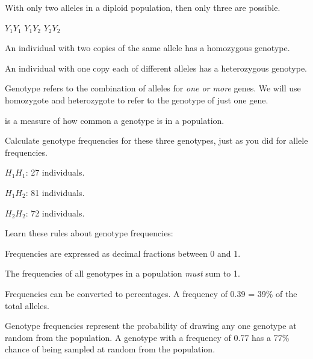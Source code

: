 \documentclass[t]{beamer}
\begin{document}
%
\begin{frame}[t]{With only two alleles in a diploid population, then only three  are possible.}

\Large
\hfil \alert<2>{$Y_1Y_1$} \hfil \alert<3>{$Y_1Y_2$} \hfil \alert<2>{$Y_2Y_2$} \hfill

\normalsize
	\hangpara {}An individual with two copies of the same allele has a \alert<2>{homozygous} genotype.
	
	\hangpara {}An individual with one copy each of different alleles has a \alert<3>{heterozygous} genotype.
	
	\hangpara {}\textsc{} Genotype refers to the combination of alleles for \emph{one or more} genes. We will use homozygote and heterozygote to refer to the genotype of just one gene.

\end{frame}
%
\begin{frame}[t]{ is a measure of how common a genotype is in a population.}

	\hangpara Calculate genotype frequencies for these three genotypes, just as you did for allele frequencies.
	
	\hangpara \quad $H_1H_1$: 27 individuals. \onslide<2>{0.15}
	
	\hangpara \quad	$H_1H_2$: 81 individuals. \onslide<2>{0.45}
	
	\hangpara \quad $H_2H_2$: 72 individuals. \onslide<2>{0.40}

\end{frame}
%
\begin{frame}[t]{Learn these rules about genotype frequencies:}

	\hangpara Frequencies are expressed as decimal fractions between 0 and 1.
	
	\hangpara The frequencies of all genotypes in a population \emph{must} sum to 1.
	
	\hangpara Frequencies can be converted to percentages. A frequency of 0.39 = 39\% of the total alleles.
	
	\hangpara Genotype frequencies represent the probability of drawing any one genotype at random from the population. A genotype with a frequency of 0.77 has a 77\% chance of being sampled at random from the population.

\end{frame}
%
\end{document}
